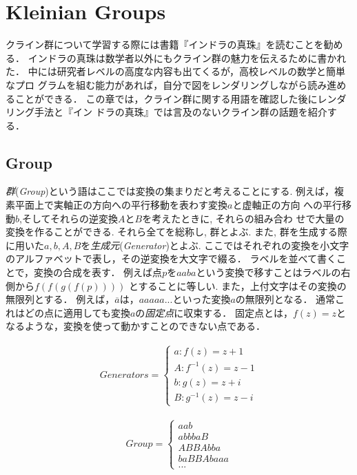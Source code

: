 
\section{Kleinian Groups}
クライン群について学習する際には書籍『インドラの真珠』\cite{indra}を読むことを勧める．
インドラの真珠は数学者以外にもクライン群の魅力を伝えるために書かれた．
中には研究者レベルの高度な内容も出てくるが，高校レベルの数学と簡単なプロ
グラムを組む能力があれば，自分で図をレンダリングしながら読み進めることができる．
この章では，クライン群に関する用語を確認した後にレンダリング手法と『イン
ドラの真珠』では言及のないクライン群の話題を紹介する．

\subsection{Group}

\emph{群}(\textit{Group})という語はここでは変換の集まりだと考えることにする.
例えば，複素平面上で実軸正の方向への平行移動を表わす変換$a$と虚軸正の方向
への平行移動$b$,そしてそれらの逆変換$A$と$B$を考えたときに, それらの組み合わ
せで大量の変換を作ることができる. それら全てを総称し, 群とよぶ.
また, 群を生成する際に用いた$a, b, A, B$を\emph{生成元}(\textit{Generator})とよぶ.
ここではそれぞれの変換を小文字のアルファベットで表し，その逆変換を大文字で綴る．
ラベルを並べて書くことで，変換の合成を表す．
例えば点$p$を$aaba$という変換で移すことはラベルの右側から$f(f(g(f(p))))$
とすることに等しい.
また，上付文字はその変換の無限列とする．
例えば，$\overline{a}$は，$aaaaa...$といった変換$a$の無限列となる．
通常これはどの点に適用しても変換$a$の\emph{固定点}に収束する．
固定点とは，$f(z) = z$となるような，変換を使って動かすことのできない点である．

\begin{minipage}{0.5\hsize}
 \begin{align*}
  Generators =
   \begin{cases}
    a \colon f(z) = z + 1  \\
    A \colon f^{-1}(z) = z - 1 \\
    b \colon g(z) = z + i \\
    B \colon g^{-1}(z) = z - i
   \end{cases}
 \end{align*}
\end{minipage}
\begin{minipage}{0.5\hsize}
 \begin{align*}
  Group =
   \begin{cases}
    aab\\
    abbbaB \\
    ABBAbba \\
    baBBAbaaa \\
    ...
   \end{cases}
 \end{align*}
\end{minipage}

